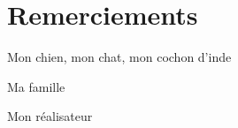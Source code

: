 \section*{Remerciements}


\vspace{2cm}
\par 
Mon chien, mon chat, mon cochon d'inde

\bigskip
Ma famille

\bigskip
Mon réalisateur